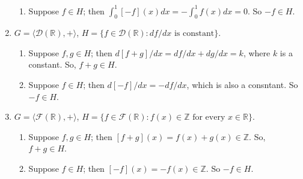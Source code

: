 \documentclass{article}
\begin{document}
\begin{enumerate}
\begin{enumerate}[label=(\roman*)]
                \item Suppose $f \in H$; then $\int_0^1[-f](x)dx = -\int_0^1f(x)dx = 0$. So $-f \in H$.
            \end{enumerate}
        \item $G = \langle \mathscr{D}(\mathbb{R}), +\rangle$, $H = \{f \in \mathscr{D}(\mathbb{R}): df/dx \text{ is constant}\}$.
            \begin{enumerate}[label=(\roman*)]
                \item Suppose $f, g \in H$; then $d[f + g]/dx = df/dx + dg/dx = k$, where $k$ is a constant.  So, $f + g \in H$.
                \item Suppose $f \in H$; then $d[-f]/dx = -df/dx$, which is also a consntant. So $-f \in H$.
            \end{enumerate}
        \item $G = \langle \mathscr{F}(\mathbb{R}), +\rangle$, $H = \{f \in \mathscr{F}(\mathbb{R}): f(x) \in \mathbb{Z} \text{ for every $x \in \mathbb{R}$}\}$.
            \begin{enumerate}[label=(\roman*)]
                \item Suppose $f, g \in H$; then $[f + g](x) = f(x) + g(x) \in \mathbb{Z}$.  So, $f + g \in H$.
                \item Suppose $f \in H$; then $[-f](x) = -f(x) \in \mathbb{Z}$. So $-f \in H$.
            \end{enumerate}
\end{enumerate}
\end{document}
